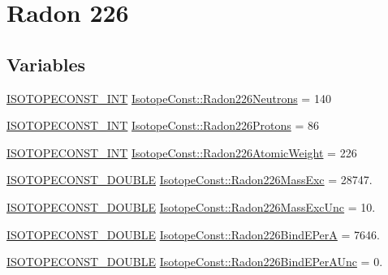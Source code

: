 \hypertarget{group___isotope_const-_radon-_rn226}{}\section{Radon 226}
\label{group___isotope_const-_radon-_rn226}
\subsection*{Variables}
\begin{DoxyCompactItemize}
\item 
\mbox{\hyperlink{group___isotope_const-_macros_ga5f18360b3e99483a35c32d789e62621c}{I\+S\+O\+T\+O\+P\+E\+C\+O\+N\+S\+T\+\_\+\+I\+NT}} \mbox{\hyperlink{group___isotope_const-_radon-_rn226_ga2b2001ba406867ee3f6d08e0d77c288c}{Isotope\+Const\+::\+Radon226\+Neutrons}} = 140
\item 
\mbox{\hyperlink{group___isotope_const-_macros_ga5f18360b3e99483a35c32d789e62621c}{I\+S\+O\+T\+O\+P\+E\+C\+O\+N\+S\+T\+\_\+\+I\+NT}} \mbox{\hyperlink{group___isotope_const-_radon-_rn226_ga4ff350f0af23a36ad06efe066edb8319}{Isotope\+Const\+::\+Radon226\+Protons}} = 86
\item 
\mbox{\hyperlink{group___isotope_const-_macros_ga5f18360b3e99483a35c32d789e62621c}{I\+S\+O\+T\+O\+P\+E\+C\+O\+N\+S\+T\+\_\+\+I\+NT}} \mbox{\hyperlink{group___isotope_const-_radon-_rn226_gac13a974c7c43bf13c0d28eba7381c271}{Isotope\+Const\+::\+Radon226\+Atomic\+Weight}} = 226
\item 
\mbox{\hyperlink{group___isotope_const-_macros_ga8f45a7272ce02c0b4c65c44636ed719a}{I\+S\+O\+T\+O\+P\+E\+C\+O\+N\+S\+T\+\_\+\+D\+O\+U\+B\+LE}} \mbox{\hyperlink{group___isotope_const-_radon-_rn226_ga070af57ea34f9cfc39f1338f606e1429}{Isotope\+Const\+::\+Radon226\+Mass\+Exc}} = 28747.
\item 
\mbox{\hyperlink{group___isotope_const-_macros_ga8f45a7272ce02c0b4c65c44636ed719a}{I\+S\+O\+T\+O\+P\+E\+C\+O\+N\+S\+T\+\_\+\+D\+O\+U\+B\+LE}} \mbox{\hyperlink{group___isotope_const-_radon-_rn226_ga07f10b22ff518a228389c014aef5d3e6}{Isotope\+Const\+::\+Radon226\+Mass\+Exc\+Unc}} = 10.
\item 
\mbox{\hyperlink{group___isotope_const-_macros_ga8f45a7272ce02c0b4c65c44636ed719a}{I\+S\+O\+T\+O\+P\+E\+C\+O\+N\+S\+T\+\_\+\+D\+O\+U\+B\+LE}} \mbox{\hyperlink{group___isotope_const-_radon-_rn226_ga4b611649a641f412efb1eca7e2488c30}{Isotope\+Const\+::\+Radon226\+Bind\+E\+PerA}} = 7646.
\item 
\mbox{\hyperlink{group___isotope_const-_macros_ga8f45a7272ce02c0b4c65c44636ed719a}{I\+S\+O\+T\+O\+P\+E\+C\+O\+N\+S\+T\+\_\+\+D\+O\+U\+B\+LE}} \mbox{\hyperlink{group___isotope_const-_radon-_rn226_gac4f9d3e4677e28790e2189a795d128e8}{Isotope\+Const\+::\+Radon226\+Bind\+E\+Per\+A\+Unc}} = 0.

\end{DoxyCompactItemize}
